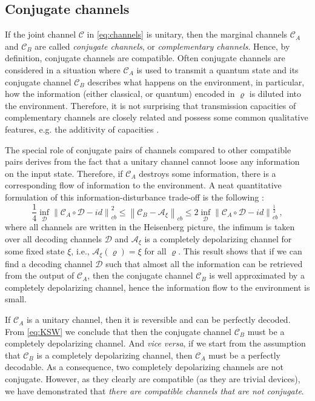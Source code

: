 \documentclass[12pt]{iopart}
\theoremstyle{definition}
\newcommand{\no}[1]{\left\|#1\right\|} %
\newcommand{\Cc}{\mathcal{C}} %
\begin{document}
{%
\subsection{Conjugate channels}\label{sec:complementarity}

If the joint channel $\Cc$ in \eqref{eq:channels} is unitary, then the marginal channels $\Cc_A$ and $\Cc_B$ are called \emph{conjugate channels}, or \emph{complementary channels}. Hence, by definition, conjugate channels are compatible. Often conjugate channels are considered in a situation where $\Cc_A$ is used to transmit a quantum state and its conjugate channel $\Cc_B$ describes what happens on the environment, in particular, how the information (either classical, or quantum) encoded in $\varrho$ is diluted into the environment. 
Therefore, it is not surprising that transmission capacities of complementary channels are closely related \cite{KiMaNaRu07} and possess some common qualitative features, e.g. the additivity of capacities \cite{Holevo05}.

The special role of conjugate pairs of channels compared to other compatible pairs derives from the fact that a unitary channel cannot loose any information on the input state. Therefore, if $\Cc_A$ destroys some information, there is a corresponding flow of information to the environment. 
A neat quantitative formulation of this information-disturbance trade-off is the following \cite{KrScWe08ieee}:
\begin{equation}\label{eq:KSW}
\frac{1}{4} \inf_\mathcal{D} \no{ \Cc_A \circ \mathcal{D} - id }_{cb}^2 \leq   \no{ \Cc_B  - \mathcal{A}_\xi }_{cb} \leq 2 \inf_\mathcal{D} \no{ \Cc_A \circ \mathcal{D} - id }_{cb}^{\frac{1}{2}} \, ,  
\end{equation}
where all channels are written in the Heisenberg picture, the infimum is taken over all decoding channels $\mathcal{D}$ and $\mathcal{A}_\xi$ is a completely depolarizing channel for some fixed state $\xi$, i.e., $\mathcal{A}_\xi(\varrho)=\xi$ for all $\varrho$.
This result shows that if we can find a decoding channel $\mathcal{D}$ such that almost all the information can be retrieved from the output of $\Cc_A$, then the conjugate channel $\Cc_B$ is well approximated
by a completely depolarizing channel, hence the information flow to the environment is small.

If $\Cc_A$ is a unitary channel, then it is reversible and can be perfectly decoded. 
From \eqref{eq:KSW} we conclude that then the conjugate channel $\Cc_B$ must be a completely depolarizing channel. And \emph{vice versa}, if we start from the assumption that $\Cc_B$ is a completely depolarizing channel, then $\Cc_A$ must be a perfectly decodable.
As a consequence, two completely depolarizing channels are not conjugate.
However, as they clearly are compatible (as they are trivial devices), we have demonstrated that \emph{there are compatible channels that are not conjugate}.

}
\end{document}
